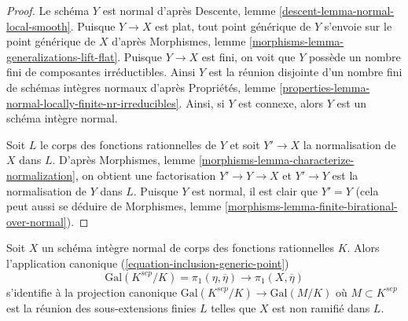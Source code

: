 \begin{proof}
Le schéma $Y$ est normal d'après
Descente, lemme \ref{descent-lemma-normal-local-smooth}.
Puisque $Y \to X$ est plat, tout point générique de $Y$ s'envoie
sur le point générique de $X$ d'après
Morphismes, lemme \ref{morphisms-lemma-generalizations-lift-flat}.
Puisque $Y \to X$ est fini, on voit que $Y$ possède un nombre fini
de composantes irréductibles. Ainsi $Y$ est la réunion disjointe d'un
nombre fini de schémas intègres normaux d'après
Propriétés, lemme \ref{properties-lemma-normal-locally-finite-nr-irreducibles}.
Ainsi, si $Y$ est connexe, alors $Y$ est un schéma intègre normal.

\medskip\noindent
Soit $L$ le corps des fonctions rationnelles de $Y$ et soit $Y' \to X$ la normalisation
de $X$ dans $L$. D'après
Morphismes, lemme \ref{morphisms-lemma-characterize-normalization},
on obtient une factorisation $Y' \to Y \to X$ et $Y' \to Y$ est
la normalisation de $Y$ dans $L$. Puisque $Y$ est normal, il est clair
que $Y' = Y$ (cela peut aussi se déduire de
Morphismes, lemme \ref{morphisms-lemma-finite-birational-over-normal}).
\end{proof}

\begin{proposition}
\label{proposition-normal}
Soit $X$ un schéma intègre normal de corps des fonctions rationnelles $K$.
Alors l'application canonique (\ref{equation-inclusion-generic-point})
$$
\text{Gal}(K^{sep}/K) = \pi_1(\eta, \overline{\eta})
\longrightarrow \pi_1(X, \overline{\eta})
$$
s'identifie à la projection canonique
$\text{Gal}(K^{sep}/K) \to \text{Gal}(M/K)$ où $M \subset K^{sep}$
est la réunion des sous-extensions finies $L$
telles que $X$ est non ramifié dans $L$.
\end{proposition}


